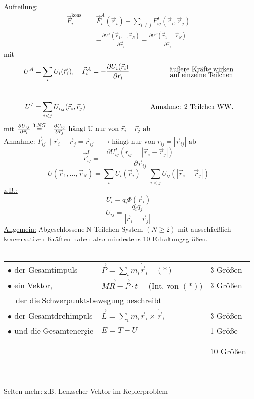 \documentclass[titlepage,12pt,a4paper,ngerman]{report}
\newcommand{\tx}[1]{\textrm{#1}}
\begin{document}
{\underline{Aufteilung:}
\begin{align*}
\vec{F}^{\tx{kons}}_i &= \vec{F}_i^A (\vec{r}_i) + \sum_{i\neq j} F_{ij}^I (\vec{r}_i,\vec{r}_j)\\
&= -\frac{\partial U^A(\vec{r}_1,\dots , \vec{r}_N)}{\partial \vec{r}_i} - \frac{\partial U^F(\vec{r}_1,\dots , \vec{r}_N)}{\partial \vec{r}_i}
\end{align*}
mit 
\begin{align*}
U^A &= \sum_i U_i (\vec{r}_i), \quad \vec{F}^A_i = -\frac{\partial U_i(\vec{r}_i)}{\partial \vec{r}_i} \qquad &\begin{Large}\substack{\tx{äußere Kräfte wirken} \\ \tx{auf einzelne Teilchen}}\end{Large} \\\\
U^I &= \sum_{i < j} U_{i,j} (\vec{r}_i,\vec{r}_j) \qquad  & {\tx{Annahme: 2 Teilchen WW.}}
\end{align*}
mit $ \frac{\partial U_{ij}}{\partial \vec{r}_i} \buildrel 3.NG \over = -\frac{\partial U_{ij}}{\partial \vec{r}_j} \textrm{ hängt U nur von } \vec{r}_i - \vec{r}_j \textrm{ ab }$\\
Annahme: $\vec{F}_{ij} \parallel \vec{r}_i - \vec{r}_j = \vec{r}_{ij} \quad \rightarrow \textrm{hängt nur von } r_{ij} = | \vec{r}_{ij}| \textrm{ ab }$
$$ \vec{F}_{ij}^I = - \frac{\partial U^I_{ij} (r_{ij} = |\vec{r}_i - \vec{r}_j|)}{\partial \vec{r}_{ij}}$$
$$ U(\vec{r}_1 , \dots , \vec{r}_N) = \sum_i U_i (\vec{r}_i) + \sum _{i<j} U_{ij} (|\vec{r}_i- \vec{r}_j |)$$
\underline{z.B.:} $$U_i = q_i \Phi (\vec{r}_i)$$
$$U_{ij} = \frac{q_i q_j}{|\vec{r}_i - \vec{r}_j |}$$
\underline{Allgemein:} Abgeschlossene N-Teilchen System $(N\ge 2)$ mit ausschließlich konservativen Kräften haben also mindestens 10 Erhaltungsgrößen:\\\\
\begin{tabular}{lll}
	$\bullet$ der Gesamtimpuls &  $\vec{P} = \sum_i m_i \dot{\vec{r}}_i \quad (*)$	& 3 Größen \\ 
	$\bullet$ ein Vektor, & $M\vec{R} - \vec{P} \cdot t\quad $ (Int. von $(*)$)	& 3 Größen \\ 
	\multicolumn{2}{l}{\ \,  der die Schwerpunktsbewegung beschreibt}  \\
	$\bullet$ der Gesamtdrehimpuls & $\vec{L} = \sum_i m_i \vec{r}_i \times \dot{\vec{r}}_i$	& 3 Größen \\ 
	$\bullet$ und die Gesamtenergie & $ E = T+U$	& 1 Größe \\
	\\[-10pt]
	\hline\\[-10pt]
	& & \underline{10 Größen}
\end{tabular} \\\\
Selten mehr: z.B. Lenzscher Vektor im Keplerproblem

}
\end{document}
